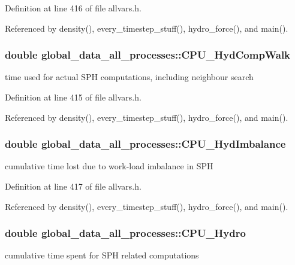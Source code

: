 Definition at line 416 of file allvars.h.



Referenced by density(), every\_\-timestep\_\-stuff(), hydro\_\-force(), and main().

\hypertarget{structglobal__data__all__processes_a918e3d80cf4fdaf22a803f4014588ad4}{
\subsubsection[{CPU\_\-HydCompWalk}]{\setlength{\rightskip}{0pt plus 5cm}double {\bf global\_\-data\_\-all\_\-processes::CPU\_\-HydCompWalk}}}
\label{structglobal__data__all__processes_a918e3d80cf4fdaf22a803f4014588ad4}
time used for actual SPH computations, including neighbour search 

Definition at line 415 of file allvars.h.



Referenced by density(), every\_\-timestep\_\-stuff(), hydro\_\-force(), and main().

\hypertarget{structglobal__data__all__processes_a848f914dfb3ae24d6faedc1944bcb265}{
\subsubsection[{CPU\_\-HydImbalance}]{\setlength{\rightskip}{0pt plus 5cm}double {\bf global\_\-data\_\-all\_\-processes::CPU\_\-HydImbalance}}}
\label{structglobal__data__all__processes_a848f914dfb3ae24d6faedc1944bcb265}
cumulative time lost due to work-\/load imbalance in SPH 

Definition at line 417 of file allvars.h.



Referenced by density(), every\_\-timestep\_\-stuff(), hydro\_\-force(), and main().

\hypertarget{structglobal__data__all__processes_add20a8e70f3c4cc7912dc81ef141daa2}{
\subsubsection[{CPU\_\-Hydro}]{\setlength{\rightskip}{0pt plus 5cm}double {\bf global\_\-data\_\-all\_\-processes::CPU\_\-Hydro}}}
\label{structglobal__data__all__processes_add20a8e70f3c4cc7912dc81ef141daa2}
cumulative time spent for SPH related computations 

